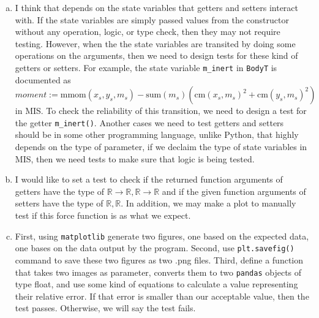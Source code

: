 \documentclass[12pt]{article}
\begin{document}
\begin{enumerate}[a)]

\item I think that depends on the state variables that getters and setters interact with. If the state variables are simply passed values from the constructor without any operation, logic, or type check, then they may not require testing. However, when the the state variables are transited by doing some operations on the arguments, then we need to design tests for these kind of getters or setters. For example, the state variable \verb|m_inert| in \verb|BodyT| is documented as $ \mathit{moment} :=  \text{mmom}(x_s, y_s, m_s) - \text{sum}(m_s) (\text{cm}(x_s, m_s)^2 + \text{cm}(y_s, m_s)^2)$ in MIS. To check the reliability of this transition, we need to design a test for the getter \verb|m_inert()|. Another cases we need to test getters and setters should be in some other programming language, unlike Python, that highly depends on the type of parameter, if we declaim the type of state variables in MIS, then we need tests to make sure that logic is being tested.

\item I would like to set a test to check if the returned function arguments of getters have the type of $\mathbb{R} \rightarrow \mathbb{R}, \mathbb{R} \rightarrow \mathbb{R}$ and if the given function arguments of setters have the type of $\mathbb{R}, \mathbb{R}$. In addition, we may make a plot to manually test if this force function is as what we expect.

\item First, using \verb|matplotlib| generate two figures, one based on the expected data, one bases on the data output by the program. Second, use \verb|plt.savefig()| command to save these two figures as two .png files. Third, define a function that takes two images as parameter, converts them to two \verb|pandas| objects of type float, and use some kind of equations to calculate a value representing their relative error. If that error is smaller than our acceptable value, then the test passes. Otherwise, we will say the test fails.


\end{enumerate}
\end{document}
